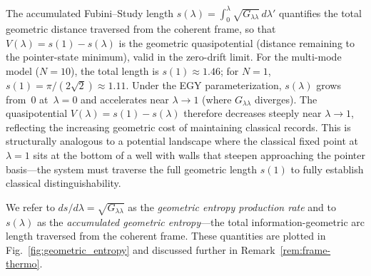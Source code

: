 \documentclass[aps,prd,twocolumn,superscriptaddress,nofootinbib,floatfix]{revtex4-2}
\newcommand{\Gll}{G_{\lambda\lambda}}
\begin{document}
The accumulated Fubini--Study length $s(\lambda) = \int_0^\lambda\!\sqrt{\Gll}\,d\lambda'$ quantifies the total geometric distance traversed from the coherent frame, so that $V(\lambda) = s(1) - s(\lambda)$ is the geometric quasipotential (distance remaining to the pointer-state minimum), valid in the zero-drift limit. For the multi-mode model ($N=10$), the total length is $s(1) \approx 1.46$; for $N=1$, $s(1) = \pi/(2\sqrt{2}) \approx 1.11$. Under the EGY parameterization, $s(\lambda)$ grows from~$0$ at~$\lambda=0$ and accelerates near $\lambda\to 1$ (where $\Gll$ diverges). The quasipotential $V(\lambda) = s(1) - s(\lambda)$ therefore decreases steeply near $\lambda\to 1$, reflecting the increasing geometric cost of maintaining classical records. This is structurally analogous to a potential landscape where the classical fixed point at $\lambda=1$ sits at the bottom of a well with walls that steepen approaching the pointer basis---the system must traverse the full geometric length $s(1)$ to fully establish classical distinguishability.

We refer to $ds/d\lambda = \sqrt{\Gll}$ as the \emph{geometric entropy production rate} and to $s(\lambda)$ as the \emph{accumulated geometric entropy}---the total information-geometric arc length traversed from the coherent frame. These quantities are plotted in Fig.~\ref{fig:geometric_entropy} and discussed further in Remark~\ref{rem:frame-thermo}.
\end{document}
